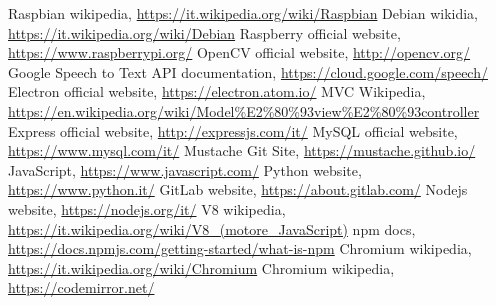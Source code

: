 \begin{thebibliography}{99}
\raggedright

 Raspbian wikipedia, \url{https://it.wikipedia.org/wiki/Raspbian}
 Debian wikidia, \url{https://it.wikipedia.org/wiki/Debian}
 Raspberry official website, \url{https://www.raspberrypi.org/}
 OpenCV official website, \url{http://opencv.org/}
 Google Speech to Text API documentation, \url{https://cloud.google.com/speech/}
 Electron official website, \url{https://electron.atom.io/}
 MVC Wikipedia, \url{https://en.wikipedia.org/wiki/Model%E2%80%93view%E2%80%93controller}
 Express official website, \url{http://expressjs.com/it/}
 MySQL official website, \url{https://www.mysql.com/it/}
 Mustache Git Site, \url{https://mustache.github.io/}
 JavaScript, \url{https://www.javascript.com/}
 Python website, \url{https://www.python.it/}
 GitLab website, \url{https://about.gitlab.com/}
 Nodejs website, \url{https://nodejs.org/it/}
 V8 wikipedia, \url{https://it.wikipedia.org/wiki/V8_(motore_JavaScript)}
 npm docs, \url{https://docs.npmjs.com/getting-started/what-is-npm}
 Chromium wikipedia, \url{https://it.wikipedia.org/wiki/Chromium}
 Chromium wikipedia, \url{https://codemirror.net/}

\end{thebibliography}

